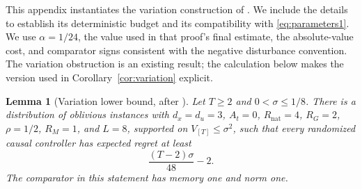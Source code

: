 \documentclass[11pt]{article}
\newtheorem{lemma}[theorem]{Lemma}
\theoremstyle{remark}
\newcommand{\nat}{\mathrm{nat}}
\begin{document}
This appendix instantiates the variation construction of
\citet[Appendix~F.2]{minasyan}. We include the details to establish its
deterministic budget and its compatibility with \eqref{eq:parameters1}.
We use $\alpha=1/24$, the value used in that proof's final estimate,
the absolute-value cost, and comparator signs consistent with the negative
disturbance convention. The variation obstruction is an existing result;
the calculation below makes the version used in Corollary~\ref{cor:variation}
explicit.

\begin{lemma}[Variation lower bound, after \citet{minasyan}]\label{lem:variation}
Let $T\ge2$ and $0<\sigma\le1/8$.  There is a distribution of oblivious
instances with $d_x=d_u=3$, $A_t=0$, $R_{\nat}=4$, $R_G=2$,
$\rho=1/2$, $R_M=1$, and $L=8$, supported on $V_{[T]}\le\sigma^2$,
such that every randomized causal controller has expected regret at least
\[
 \frac{(T-2)\sigma}{48}-2.
\]
The comparator in this statement has memory one and norm one.
\end{lemma}
\end{document}
